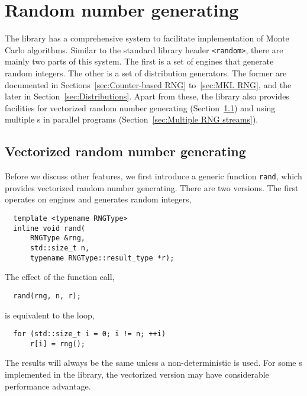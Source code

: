 \chapter{Random number generating}
\label{chap:Random number generating}

The library has a comprehensive \rng system to facilitate implementation of
Monte Carlo algorithms. Similar to the standard library header \verb|<random>|,
there are mainly two parts of this system. The first is a set of \rng{} engines
that generate random integers. The other is a set of distribution generators.
The former are documented in Sections~\ref{sec:Counter-based RNG}
to~\ref{sec:MKL RNG}, and the later in Section~\ref{sec:Distributions}. Apart
from these, the library also provides facilities for vectorized random number
generating (Section~\ref{sec:Vectorized random number generating}) and using
multiple \rng{}s in parallel programs (Section~\ref{sec:Multiple RNG streams}).

\section{Vectorized random number generating}
\label{sec:Vectorized random number generating}

Before we discuss other features, we first introduce a generic function
\verb|rand|, which provides vectorized random number generating. There are two
versions. The first operates on \rng engines and generates random integers,
\begin{Verbatim}
  template <typename RNGType>
  inline void rand(
      RNGType &rng,
      std::size_t n,
      typename RNGType::result_type *r);
\end{Verbatim}
The effect of the function call,
\begin{Verbatim}
  rand(rng, n, r);
\end{Verbatim}
is equivalent to the loop,
\begin{Verbatim}
  for (std::size_t i = 0; i != n; ++i)
      r[i] = rng();
\end{Verbatim}
The results will always be the same unless a non-deterministic \rng is used.
For some \rng{}s implemented in the library, the vectorized version may have
considerable performance advantage.

